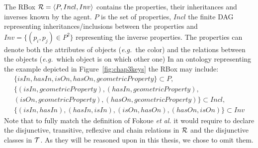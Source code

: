 \documentclass[a4paper,11pt,twoside]{StyleThese}
\begin{document}
The RBox $\mathcal{R} = \langle P, Incl, Inv \rangle$ contains the properties, their inheritances and inverses known by the agent. $P$ is the set of properties, $Incl$ the finite DAG representing inheritances/inclusions between the properties and $Inv = \{(p_i, p_j) \in P^2\}$ representing the inverse properties. The properties can denote both the attributes of objects (\textit{e.g.}~the color) and the relations between the objects (\textit{e.g.}~which object is on which other one) In an ontology representing the example depicted in Figure~\ref{fig:chap3keys} the RBox may include: 
\begin{multline*}
\{isIn, hasIn, isOn, hasOn, geometricProperty\} \subset P,\\
\{(isIn, geometricProperty), (hasIn, geometricProperty),\\
(isOn, geometricProperty), (hasOn, geometricProperty)\} \subset Incl,\\
\{(isIn, hasIn), (hasIn, isIn), (isOn, hasOn), (hasOn, isOn)\} \subset Inv
\end{multline*}
Note that to fully match the definition of Fokoue \textit{et al.} \cite{fokoue2006summary} it would require to declare the disjunctive, transitive, reflexive and chain relations in $\mathcal{R}$ and the disjunctive classes in $\mathcal{T}$. As they will be reasoned upon in this thesis, we chose to omit them.
\end{document}
